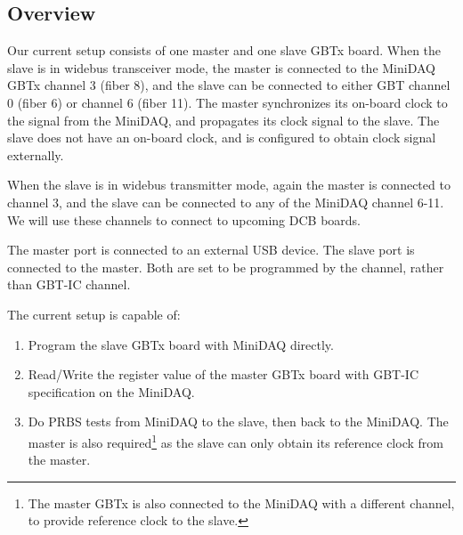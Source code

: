 \subsection{Overview}
Our current setup consists of one master and one slave GBTx board.
When the slave is in widebus transceiver mode,
the master is connected to the MiniDAQ GBTx channel 3 (fiber 8),
and the slave can be connected to either GBT channel 0 (fiber 6) or channel 6
(fiber 11).
The master synchronizes its on-board clock to the signal from the MiniDAQ,
and propagates its clock signal to the slave.
The slave does not have an on-board clock,
and is configured to obtain clock signal externally.

When the slave is in widebus transmitter mode,
again the master is connected to channel 3,
and the slave can be connected to any of the MiniDAQ channel 6-11.
We will use these channels to connect to upcoming DCB boards.

The master \itwoc port is connected to an external USB device.
The slave \itwoc port is connected to the master.
Both are set to be programmed by the \itwoc channel,
rather than GBT-IC channel.

The current setup is capable of:
\begin{enumerate}
    \item Program the slave GBTx board with MiniDAQ directly.
    \item Read/Write the register value of the master GBTx board with GBT-IC
        specification on the MiniDAQ.
    \item Do PRBS tests from MiniDAQ to the slave, then back to the
        MiniDAQ.
        The master is also required\footnote{
            The master GBTx is also connected to the MiniDAQ with a different
        channel, to provide reference clock to the slave.}
        as the slave can only obtain its reference clock from the master.
\end{enumerate}
